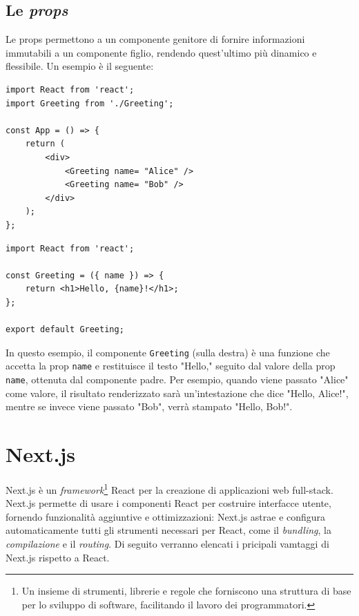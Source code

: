 \documentclass[target=bach,aauheader=,style=]{thud}
\begin{document}
\subsection{Le \textit{props}}
Le props permettono a un componente genitore di fornire informazioni immutabili a un componente figlio, rendendo quest'ultimo più dinamico e flessibile. Un esempio è il seguente:

\begin{minipage}[t]{0.45\textwidth}
    \begin{lstlisting}
import React from 'react';
import Greeting from './Greeting';

const App = () => {
    return (
        <div>
            <Greeting name= "Alice" />
            <Greeting name= "Bob" />
        </div>
    );
};  
    \end{lstlisting}
\end{minipage}
\hfill
\begin{minipage}[t]{0.45\textwidth}
    \begin{lstlisting}
import React from 'react';

const Greeting = ({ name }) => {
    return <h1>Hello, {name}!</h1>;
};

export default Greeting;
    \end{lstlisting}
\end{minipage}

\noindent In questo esempio, il componente \texttt{Greeting} (sulla destra) è una funzione che accetta la prop \texttt{name} e restituisce il testo  "Hello," seguito dal valore della prop \texttt{name}, ottenuta dal componente padre. Per esempio, quando viene passato "Alice" come valore, il risultato renderizzato sarà un'intestazione che dice "Hello, Alice!", mentre se invece viene passato "Bob", verrà stampato "Hello, Bob!".

\section{Next.js}
Next.js \cite{nextjsdocs2024} è un \textit{framework}\footnote{Un insieme di strumenti, librerie e regole che forniscono una struttura di base per lo sviluppo di software, facilitando il lavoro dei programmatori.} React per la creazione di applicazioni web full-stack. Next.js permette di usare i componenti React per costruire interfacce utente, fornendo funzionalità aggiuntive e ottimizzazioni: Next.js astrae e configura automaticamente tutti gli strumenti necessari per React, come il \textit{bundling}, la \textit{compilazione} e il \textit{routing}. Di seguito verranno elencati i pricipali vamtaggi di Next.js rispetto a React.
\end{document}
